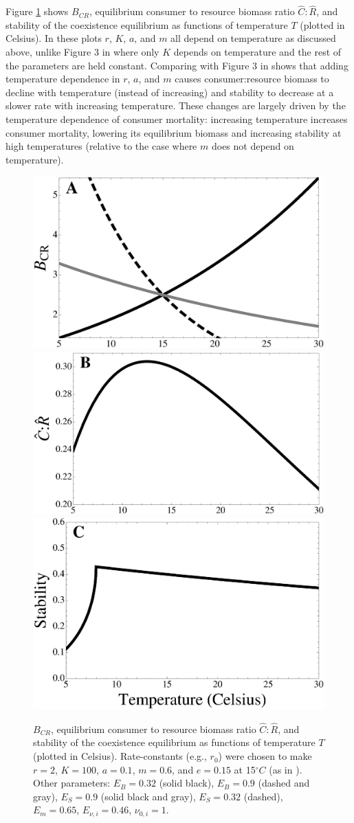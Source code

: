 \documentclass[letter,12pt]{article}
\begin{document}
Figure \ref{AllTempDep} shows $B_{CR}$, equilibrium consumer to resource biomass ratio $\hat{C}:\hat{R}$, and stability of the coexistence equilibrium as functions of temperature $T$ (plotted in Celsius).
In these plots $r$, $K$, $a$, and $m$ all depend on temperature as discussed above, unlike Figure 3 in \cite{Gilbert2014} where only $K$ depends on temperature and the rest of the parameters are held constant.
Comparing with Figure 3 in \cite{Gilbert2014} shows that adding temperature dependence in $r$, $a$, and $m$ causes consumer:resource biomass to decline with temperature (instead of increasing) and stability to decrease at a slower rate  with increasing temperature.
These changes are largely driven by the temperature dependence of consumer mortality: increasing temperature increases consumer mortality, lowering its equilibrium biomass and increasing stability at high temperatures (relative to the case where $m$ does not depend on temperature).

\begin{figure}[!ht]
\centering
\includegraphics[width=0.5\linewidth]{BCRAllTempDep}
\includegraphics[width=0.5\linewidth]{CtoRAllTempDep}
\includegraphics[width=0.5\linewidth]{StabilityAllTempDep}
\caption{
$B_{CR}$, equilibrium consumer to resource biomass ratio $\hat{C}:\hat{R}$, and stability of the coexistence equilibrium as functions of temperature $T$ (plotted in Celsius).
Rate-constants (e.g., $r_0$) were chosen to make $r = 2$, $K = 100$, $a = 0.1$, $m = 0.6$, and $e = 0.15$ at 15$^\circ C$ (as in \cite{Gilbert2014}).
Other parameters: $E_B = 0.32$ (solid black), $E_B = 0.9$ (dashed and gray), $E_S = 0.9$ (solid black and gray), $E_S = 0.32$ (dashed), $E_m = 0.65$, $E_{\nu,i} = 0.46$, $\nu_{0,i} = 1$.  
}
\label{AllTempDep}
\end{figure}
\end{document}
